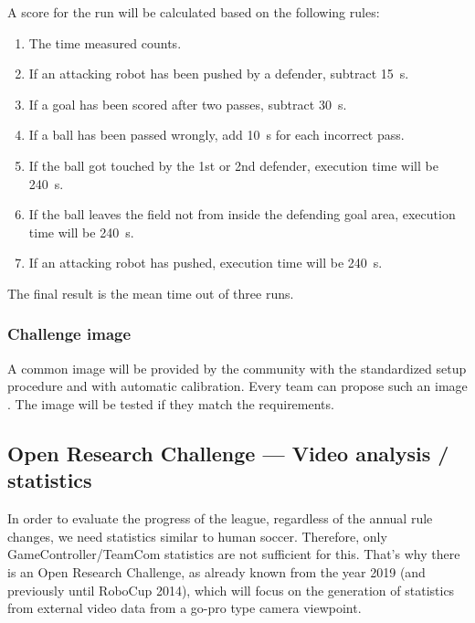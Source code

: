         A score for the run will be calculated based on the following rules:

        \begin{enumerate}
            \item The time measured counts.
            \item If an attacking robot has been pushed by a defender, subtract \qty{15}{\second}.
            \item If a goal has been scored after two passes, subtract \qty{30}{\second}.
            \item If a ball has been passed wrongly, add \qty{10}{\second} for each incorrect pass.
            \item If the ball got touched by the 1st or 2nd defender, execution time will be \qty{240}{\second}.
            \item If the ball leaves the field not from inside the defending goal area, execution time will be \qty{240}{\second}.
            \item If an attacking robot has pushed, execution time will be \qty{240}{\second}.
        \end{enumerate}

        The final result is the mean time out of three runs.

    \subsubsection{Challenge image}
        \label{sec:Challenge_image}
        A common image will be provided by the community with the standardized setup procedure and with automatic calibration. Every team can propose such an image . The image will be tested if they match the requirements.

\subsection{Open Research Challenge — Video analysis / statistics}
In order to evaluate the progress of the league, regardless of the annual rule changes, we need statistics similar to human soccer. Therefore, only GameController/TeamCom statistics are not sufficient for this. That's why there is an Open Research Challenge, as already known from the year 2019 (and previously until RoboCup 2014), which will focus on the generation of statistics from external video data from a go-pro type camera viewpoint.

